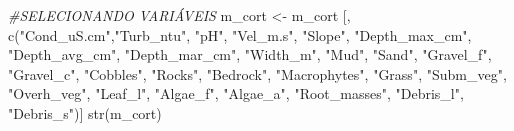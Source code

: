 \documentclass[
  letterpaper,
  DIV=11,
  numbers=noendperiod]{scrartcl}
\newenvironment{Shaded}{}{}
\newcommand{\CommentTok}[1]{\textcolor[rgb]{0.38,0.63,0.69}{\textit{#1}}}
\newcommand{\FunctionTok}[1]{\textcolor[rgb]{0.02,0.16,0.49}{#1}}
\newcommand{\NormalTok}[1]{#1}
\newcommand{\OtherTok}[1]{\textcolor[rgb]{0.00,0.44,0.13}{#1}}
\newcommand{\StringTok}[1]{\textcolor[rgb]{0.25,0.44,0.63}{#1}}
\begin{document}
\begin{Shaded}
\begin{Highlighting}[numbers=left,,]
\CommentTok{\#SELECIONANDO VARIÁVEIS}
\NormalTok{m\_cort }\OtherTok{\textless{}{-}}\NormalTok{ m\_cort [, }\FunctionTok{c}\NormalTok{(}\StringTok{"Cond\_uS.cm"}\NormalTok{,}\StringTok{"Turb\_ntu"}\NormalTok{, }\StringTok{"pH"}\NormalTok{, }\StringTok{"Vel\_m.s"}\NormalTok{, }\StringTok{"Slope"}\NormalTok{, }\StringTok{"Depth\_max\_cm"}\NormalTok{,}
                      \StringTok{"Depth\_avg\_cm"}\NormalTok{, }\StringTok{"Depth\_mar\_cm"}\NormalTok{, }\StringTok{"Width\_m"}\NormalTok{, }\StringTok{"Mud"}\NormalTok{, }\StringTok{"Sand"}\NormalTok{, }\StringTok{"Gravel\_f"}\NormalTok{, }
                      \StringTok{"Gravel\_c"}\NormalTok{, }\StringTok{"Cobbles"}\NormalTok{, }\StringTok{"Rocks"}\NormalTok{, }\StringTok{"Bedrock"}\NormalTok{, }\StringTok{"Macrophytes"}\NormalTok{, }\StringTok{"Grass"}\NormalTok{, }
                      \StringTok{"Subm\_veg"}\NormalTok{, }\StringTok{"Overh\_veg"}\NormalTok{, }\StringTok{"Leaf\_l"}\NormalTok{, }\StringTok{"Algae\_f"}\NormalTok{, }\StringTok{"Algae\_a"}\NormalTok{, }\StringTok{"Root\_masses"}\NormalTok{,}
                      \StringTok{"Debris\_l"}\NormalTok{, }\StringTok{"Debris\_s"}\NormalTok{)]}
\FunctionTok{str}\NormalTok{(m\_cort)}


\end{Highlighting}
\end{Shaded}
\end{document}
